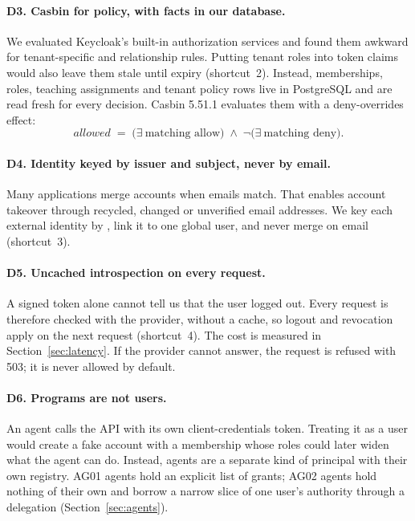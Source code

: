 \paragraph{D3. Casbin for policy, with facts in our database.}
We evaluated Keycloak's built-in authorization services and found them awkward for tenant-specific and relationship rules. Putting tenant roles into token claims would also leave them stale until expiry (shortcut~2). Instead, memberships, roles, teaching assignments and tenant policy rows live in PostgreSQL and are read fresh for every decision. Casbin 5.51.1 \cite{casbin} evaluates them with a deny-overrides effect:
\[
\textit{allowed} \;=\; \big(\exists\ \text{matching allow}\big) \;\wedge\; \neg\big(\exists\ \text{matching deny}\big).
\]

\paragraph{D4. Identity keyed by issuer and subject, never by email.}
Many applications merge accounts when emails match. That enables account takeover through recycled, changed or unverified email addresses. We key each external identity by , link it to one global user, and never merge on email (shortcut~3).

\paragraph{D5. Uncached introspection on every request.}
A signed token alone cannot tell us that the user logged out. Every request is therefore checked with the provider, without a cache, so logout and revocation apply on the next request (shortcut~4). The cost is measured in Section~\ref{sec:latency}. If the provider cannot answer, the request is refused with 503; it is never allowed by default.

\paragraph{D6. Programs are not users.}
An agent calls the API with its own client-credentials token. Treating it as a user would create a fake account with a membership whose roles could later widen what the agent can do. Instead, agents are a separate kind of principal with their own registry. AG01 agents hold an explicit list of  grants; AG02 agents hold nothing of their own and borrow a narrow slice of one user's authority through a delegation (Section~\ref{sec:agents}).

